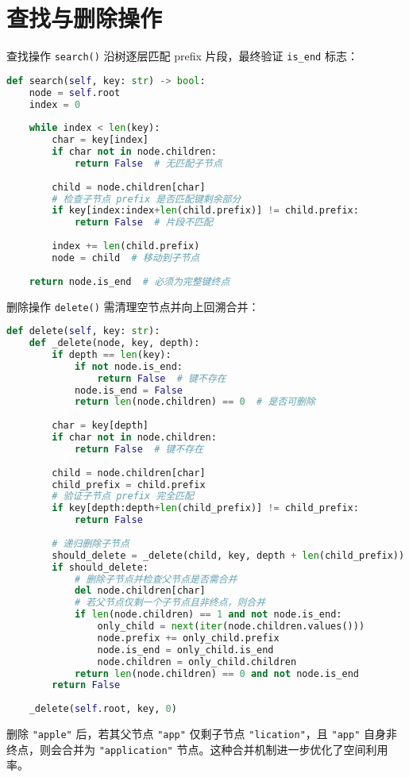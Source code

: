 \section{查找与删除操作}
查找操作 \texttt{search()} 沿树逐层匹配 prefix 片段，最终验证 \texttt{is\_{}end} 标志：\par
\begin{lstlisting}[language=python]
def search(self, key: str) -> bool:
    node = self.root
    index = 0
    
    while index < len(key):
        char = key[index]
        if char not in node.children:
            return False  # 无匹配子节点
        
        child = node.children[char]
        # 检查子节点 prefix 是否匹配键剩余部分
        if key[index:index+len(child.prefix)] != child.prefix:
            return False  # 片段不匹配
        
        index += len(child.prefix)
        node = child  # 移动到子节点
    
    return node.is_end  # 必须为完整键终点
\end{lstlisting}
删除操作 \texttt{delete()} 需清理空节点并向上回溯合并：\par
\begin{lstlisting}[language=python]
def delete(self, key: str):
    def _delete(node, key, depth):
        if depth == len(key):
            if not node.is_end:
                return False  # 键不存在
            node.is_end = False
            return len(node.children) == 0  # 是否可删除
        
        char = key[depth]
        if char not in node.children:
            return False  # 键不存在
        
        child = node.children[char]
        child_prefix = child.prefix
        # 验证子节点 prefix 完全匹配
        if key[depth:depth+len(child_prefix)] != child_prefix:
            return False
        
        # 递归删除子节点
        should_delete = _delete(child, key, depth + len(child_prefix))
        if should_delete:
            # 删除子节点并检查父节点是否需合并
            del node.children[char]
            # 若父节点仅剩一个子节点且非终点，则合并
            if len(node.children) == 1 and not node.is_end:
                only_child = next(iter(node.children.values()))
                node.prefix += only_child.prefix
                node.is_end = only_child.is_end
                node.children = only_child.children
            return len(node.children) == 0 and not node.is_end
        return False
    
    _delete(self.root, key, 0)
\end{lstlisting}
删除 \texttt{"apple"} 后，若其父节点 \texttt{"app"} 仅剩子节点 \texttt{"lication"}，且 \texttt{"app"} 自身非终点，则会合并为 \texttt{"application"} 节点。这种合并机制进一步优化了空间利用率。\par
